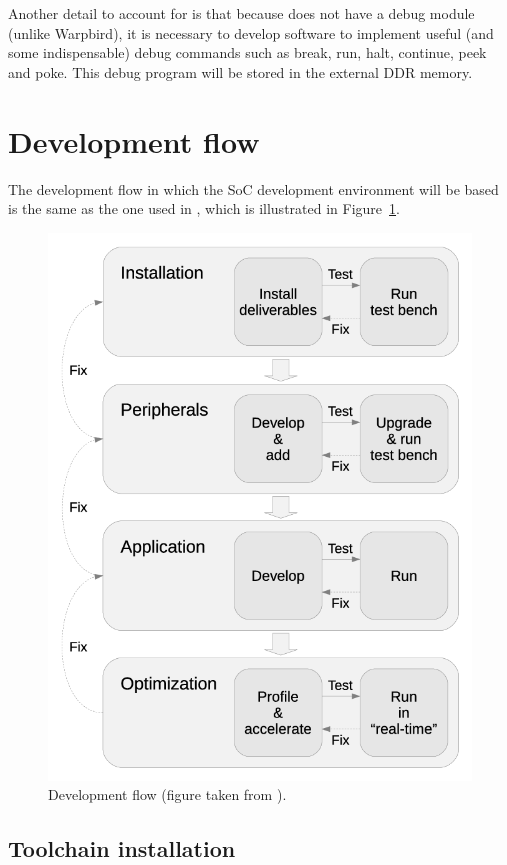 Another detail to account for is that because \socname does not have a debug module (unlike Warpbird), it is necessary to develop software to implement useful (and some indispensable) debug commands such as break, run, halt, continue, peek and poke. This debug program will be stored in the external DDR memory.



\section{Development flow}
\label{section:devel_flow}
The development flow in which the SoC development environment will be based is the same as the one used in \cite{bib:blackbird,bib:warpbird}, which is illustrated in Figure~\ref{fig:devflow}.

\begin{figure}[!h]
	\centering
	\includegraphics[width=0.5\linewidth]{Figures/devflow}
	\caption{Development flow (figure taken from \cite{bib:blackbird}).}
	\label{fig:devflow}
\end{figure}

\subsection{Toolchain installation}



